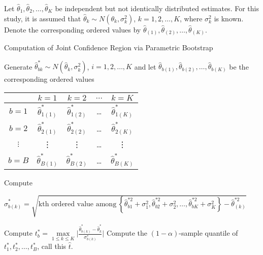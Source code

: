 \documentclass[
  12pt,
  a4paper,
]{article}
\numberwithin{equation}{section}
\begin{document}
Let \(\hat \theta_1, \hat \theta_2, \dots, \hat \theta_K\) be independent but not identically distributed estimates. For this study, it is assumed that \(\hat{\theta}_k \sim N \left(\theta_k, \sigma_k^2 \right)\), \(k = 1, 2, \dots, K\), where \(\sigma^2_k\) is known. Denote the corresponding ordered values by \(\hat \theta_{(1)}, \hat \theta_{(2)}, \dots, \hat \theta_{(K)}\).

\begin{algorithm}[H]
    \caption{Computation of Joint Confidence Region via Parametric Bootstrap} 
    \label{alg:parametricbs_ci}
    \begin{algorithmic}[1]
                \State Generate $\hat\theta^*_{bk} \sim N \left( \hat\theta_k, \sigma_k^2 \right)$, $i = 1, 2, \dots, K$ and let $\hat{\theta}_{b(1)}, \hat{\theta}_{b(2)}, \dots, \hat{\theta}_{b(K)}$ be the corresponding ordered values
            \Statex \begin{minipage}{\linewidth}
          \centering
          \begin{tabular}{|c|c|c|c|c|}
            \hline
             & $k = 1$ & $k = 2$ & $\dots$ & $k = K$ \\
            \hline
            $b = 1$ & $\hat{\theta}^*_{1(1)}$ & $\hat{\theta}^*_{1(2)}$ & \dots & $\hat{\theta}^*_{1(K)}$ \\
            \hline
            $b = 2$ & $\hat{\theta}^*_{2(1)}$ & $\hat{\theta}^*_{2(2)}$ & \dots & $\hat{\theta}^*_{2(K)}$ \\
            \hline
            $\vdots$ & \vdots & \vdots & \dots & \vdots\\
            \hline
            $b = B$ & $\hat{\theta}^*_{B(1)}$ & $\hat{\theta}^*_{B(2)}$ & \dots & $\hat{\theta}^*_{B(K)}$ \\
            \hline
          \end{tabular}
        \end{minipage}
        \State Compute 
        \Statex \begin{minipage}{\linewidth}
        \centering
$\hat\sigma^*_{b(k)} = \sqrt{\text{kth ordered value among} \ \left\{ \hat{\theta}^{*2}_{b1} + \sigma_1^2, \hat{\theta}^{*2}_{b2} + \sigma_2^2, \dots, \hat{\theta}^{*2}_{bK} + \sigma_K^2 \right\} - \hat {\theta}^{*2}_{(k)}}$
        \end{minipage}
                \State Compute $t^*_b = \underset{1 \leq k \leq K}{\max} \Bigg| \frac{\hat\theta^*_{b(k)} - \hat\theta^*_{k}}{\sigma^*_{b(k)}} \Bigg|$
        \EndFor
        \State Compute the $\left(1-\alpha\right)$-sample quantile of $t^*_1, t^*_2, \dots, t^*_B$, call this $\hat{t}$.

\end{algorithmic}
\end{algorithm}
\end{document}
